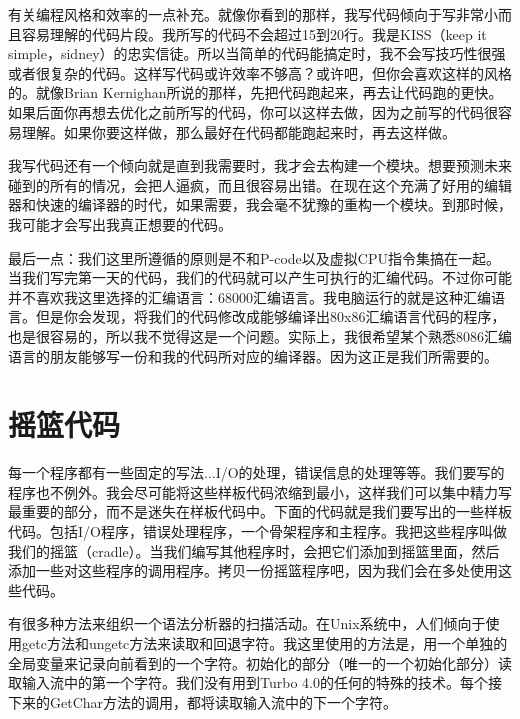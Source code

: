 有关编程风格和效率的一点补充。就像你看到的那样，我写代码倾向于写非常小而且容易理解的代码片段。我所写的代码不会超过15到20行。我是KISS（keep it simple，sidney）的忠实信徒。所以当简单的代码能搞定时，我不会写技巧性很强或者很复杂的代码。这样写代码或许效率不够高？或许吧，但你会喜欢这样的风格的。就像Brian Kernighan所说的那样，先把代码跑起来，再去让代码跑的更快。如果后面你再想去优化之前所写的代码，你可以这样去做，因为之前写的代码很容易理解。如果你要这样做，那么最好在代码都能跑起来时，再去这样做。

我写代码还有一个倾向就是直到我需要时，我才会去构建一个模块。想要预测未来碰到的所有的情况，会把人逼疯，而且很容易出错。在现在这个充满了好用的编辑器和快速的编译器的时代，如果需要，我会毫不犹豫的重构一个模块。到那时候，我可能才会写出我真正想要的代码。

最后一点：我们这里所遵循的原则是不和P-code以及虚拟CPU指令集搞在一起。当我们写完第一天的代码，我们的代码就可以产生可执行的汇编代码。不过你可能并不喜欢我这里选择的汇编语言：68000汇编语言。我电脑运行的就是这种汇编语言。但是你会发现，将我们的代码修改成能够编译出80x86汇编语言代码的程序，也是很容易的，所以我不觉得这是一个问题。实际上，我很希望某个熟悉8086汇编语言的朋友能够写一份和我的代码所对应的编译器。因为这正是我们所需要的。

\section{摇篮代码}

每一个程序都有一些固定的写法...I/O的处理，错误信息的处理等等。我们要写的程序也不例外。我会尽可能将这些样板代码浓缩到最小，这样我们可以集中精力写最重要的部分，而不是迷失在样板代码中。下面的代码就是我们要写出的一些样板代码。包括I/O程序，错误处理程序，一个骨架程序和主程序。我把这些程序叫做我们的摇篮（cradle）。当我们编写其他程序时，会把它们添加到摇篮里面，然后添加一些对这些程序的调用程序。拷贝一份摇篮程序吧，因为我们会在多处使用这些代码。

有很多种方法来组织一个语法分析器的扫描活动。在Unix系统中，人们倾向于使用getc方法和ungetc方法来读取和回退字符。我这里使用的方法是，用一个单独的全局变量来记录向前看到的一个字符。初始化的部分（唯一的一个初始化部分）读取输入流中的第一个字符。我们没有用到Turbo 4.0的任何的特殊的技术。每个接下来的GetChar方法的调用，都将读取输入流中的下一个字符。

